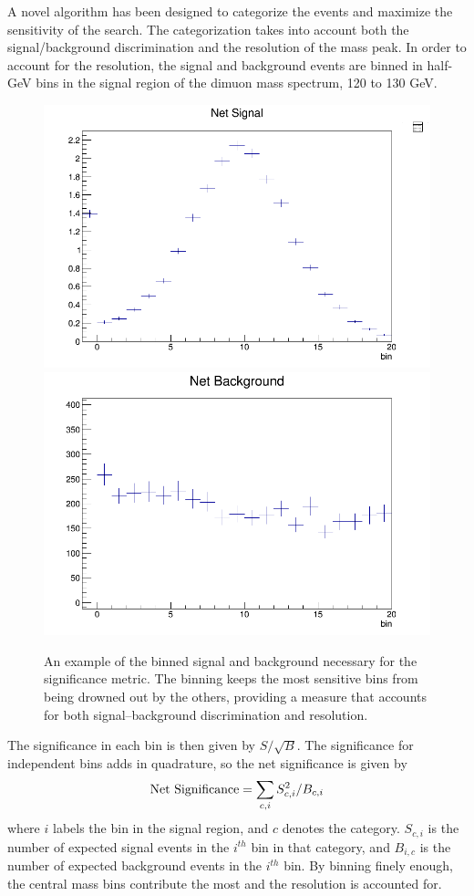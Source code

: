 A novel algorithm has been designed to categorize the events and maximize the sensitivity of the search.
The categorization takes into account both the signal/background discrimination and the resolution of the mass peak.
In order to account for the resolution, the signal and background events are binned in half-GeV bins in the signal
region of the dimuon mass spectrum, 120 to 130 GeV. 
\begin{figure}[h!]
  \centering
  \includegraphics[width=0.49\linewidth]{images/bdt_cats/binning_signal_example.png}
  \includegraphics[width=0.49\linewidth]{images/bdt_cats/binning_bg_example.png}
  \caption[An example of the signal and background histograms for the Autocategorizer.]
  {An example of the binned signal and background necessary for the significance metric. The binning keeps the most sensitive bins
   from being drowned out by the others, providing a measure that accounts for both signal--background discrimination and resolution.}
  \label{fig:binning_example}
\end{figure}
The significance in each bin is then given by $S/\sqrt{B}$.
The significance for independent bins adds in quadrature, so the net significance is given by
\begin{equation}
{\rm Net~Significance} = \sum_{c,i}S_{c,i}^{2}/B_{c,i}
\end{equation}
where $i$ labels the bin in the signal region, and $c$ denotes the category. $S_{c,i}$ is the number of expected signal
events in the $i^{th}$ bin in that category, and $B_{i,c}$ is the number of expected background events in the $i^{th}$ bin.
By binning finely enough, the central mass bins contribute the most and the resolution is accounted for.

